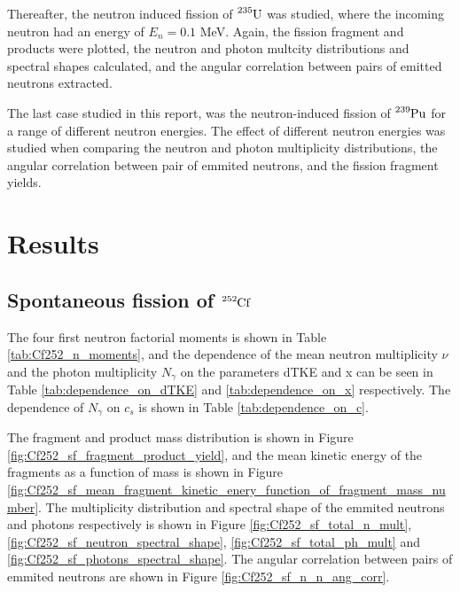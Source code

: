 \documentclass[]{article}
\begin{document}
\par 
\vspace{3mm}

Thereafter, the neutron induced fission of $\ce{^{235}U}$ was studied, where the incoming neutron had an energy of $E_n = 0.1 $ MeV. Again, the fission fragment and products were plotted, the neutron and photon multcity distributions and spectral shapes calculated, and the angular correlation between pairs of emitted neutrons extracted. 

\par 
\vspace{3mm}
The last case studied in this report, was the neutron-induced fission of $\ce{^{239}Pu}$ for a range of different neutron energies. The effect of different neutron energies was studied when comparing the neutron and photon multiplicity distributions, the angular correlation between pair of emmited neutrons, and the fission fragment yields. 

\section{Results}
\label{Results}

\subsection{Spontaneous fission of $\ce{^{252}Cf}$}

The four first neutron factorial moments is shown in Table \ref{tab:Cf252_n_moments}, and the dependence of the mean neutron multiplicity $\nu$ and the photon multiplicity $N_{\gamma}$ on the parameters dTKE and x  can be seen in Table \ref{tab:dependence_on_dTKE} and \ref{tab:dependence_on_x} respectively. The dependence of $N_{\gamma}$ on $c_s$ is shown in Table \ref{tab:dependence_on_c}.

The fragment and product mass distribution is shown in Figure \ref{fig:Cf252_sf_fragment_product_yield}, and the mean kinetic energy of the fragments as a function of mass is shown in Figure \ref{fig:Cf252_sf_mean_fragment_kinetic_enery_function_of_fragment_mass_number}. The multiplicity distribution and spectral shape of the emmited neutrons and photons respectively is shown in Figure \ref{fig:Cf252_sf_total_n_mult}, \ref{fig:Cf252_sf_neutron_spectral_shape}, \ref{fig:Cf252_sf_total_ph_mult} and \ref{fig:Cf252_sf_photons_spectral_shape}. The angular correlation between pairs of emmited neutrons are shown in Figure \ref{fig:Cf252_sf_n_n_ang_corr}.
\end{document}
